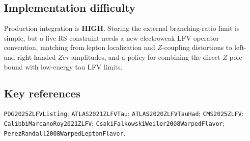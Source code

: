 \subsection*{Implementation difficulty}
Production integration is \textbf{HIGH}.  Storing the external branching-ratio
limit is simple, but a live RS constraint needs a new electroweak LFV operator
convention, matching from lepton localization and \(Z\)-coupling distortions to
left- and right-handed \(Z e\tau\) amplitudes, and a policy for combining the
direct \(Z\)-pole bound with low-energy tau LFV limits.

\subsection*{Key references}
\texttt{PDG2025ZLFVListing}; \texttt{ATLAS2021ZLFVTau};
\texttt{ATLAS2020ZLFVTauHad}; \texttt{CMS2025ZLFV};
\texttt{CalibbiMarcanoRoy2021ZLFV};
\texttt{CsakiFalkowskiWeiler2008WarpedFlavor};
\texttt{PerezRandall2008WarpedLeptonFlavor}.
